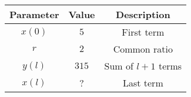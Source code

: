 \begin{tabular}{|c|c|c|}
    \hline
    \textbf{Parameter} & \textbf{Value} & \textbf{Description} \\
    \hline
    $x(0)$ & $5$ & First term \\
    \hline
    $r$ & $2$ & Common ratio \\
    \hline
    $y(l)$ & $315$ & Sum of $l+1$ terms \\
    \hline
    $x(l)$ & ? & Last term\\
    \hline
\end{tabular}

